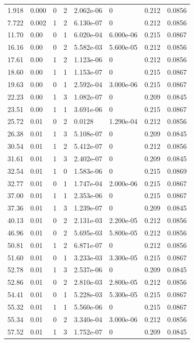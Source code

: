 \documentclass[preview]{standalone}
\begin{document}
{{\begin{tabular}{L{1.2cm}C{1.2cm} C{0.3cm}C{0.5cm} C{1.4cm}C{1.4cm} C{1.4cm}C{1.4cm}}
  1.918  &  0.000  & 0     &  2 &  2.062e-06  & 0  & 0.212 &  0.0856   \\ 
  7.722  &  0.002  & 1     &  2 &  6.130e-07  & 0  & 0.212 &  0.0856   \\ 
  11.70  &  0.00  & 0     &  1 &  6.020e-04  & 6.000e-06  & 0.215 &  0.0867   \\ 
  16.16  &  0.00  & 0     &  2 &  5.582e-03  & 5.600e-05  & 0.212 &  0.0856   \\ 
  17.61  &  0.00  & 1     &  2 &  1.123e-06  & 0  & 0.212 &  0.0856   \\ 
  18.60  &  0.00  & 1     &  1 &  1.153e-07  & 0  & 0.215 &  0.0867   \\ 
  19.63  &  0.00  & 0     &  1 &  2.592e-04  & 3.000e-06  & 0.215 &  0.0867   \\ 
  22.23  &  0.00  & 1     &  3 &  1.082e-07  & 0  & 0.209 &  0.0845   \\ 
  23.51  &  0.00  & 1     &  1 &  3.691e-06  & 0  & 0.215 &  0.0867   \\ 
  25.72  &  0.01  & 0     &  2 &  0.0128  & 1.290e-04  & 0.212 &  0.0856   \\ 
  26.38  &  0.01  & 1     &  3 &  5.108e-07  & 0  & 0.209 &  0.0845   \\ 
  30.54  &  0.01  & 1     &  2 &  5.412e-07  & 0  & 0.212 &  0.0856   \\ 
  31.61  &  0.01  & 1     &  3 &  2.402e-07  & 0  & 0.209 &  0.0845   \\ 
  32.54  &  0.01  & 1     &  0 &  1.583e-06  & 0  & 0.215 &  0.0869   \\ 
  32.77  &  0.01  & 0     &  1 &  1.747e-04  & 2.000e-06  & 0.215 &  0.0867   \\ 
  37.00  &  0.01  & 1     &  1 &  2.353e-06  & 0  & 0.215 &  0.0867   \\ 
  37.36  &  0.01  & 1     &  3 &  1.239e-07  & 0  & 0.209 &  0.0845   \\ 
  40.13  &  0.01  & 0     &  2 &  2.131e-03  & 2.200e-05  & 0.212 &  0.0856   \\ 
  46.96  &  0.01  & 0     &  2 &  5.695e-03  & 5.800e-05  & 0.212 &  0.0856   \\ 
  50.81  &  0.01  & 1     &  2 &  6.871e-07  & 0  & 0.212 &  0.0856   \\ 
  51.60  &  0.01  & 0     &  1 &  3.233e-03  & 3.300e-05  & 0.215 &  0.0867   \\ 
  52.78  &  0.01  & 1     &  3 &  2.537e-06  & 0  & 0.209 &  0.0845   \\ 
  52.86  &  0.01  & 0     &  2 &  2.810e-03  & 2.800e-05  & 0.212 &  0.0856   \\ 
  54.41  &  0.01  & 0     &  1 &  5.228e-03  & 5.300e-05  & 0.215 &  0.0867   \\ 
  55.32  &  0.01  & 1     &  1 &  5.560e-06  & 0  & 0.215 &  0.0867   \\ 
  55.34  &  0.01  & 0     &  2 &  3.340e-04  & 3.000e-06  & 0.212 &  0.0856   \\ 
  57.52  &  0.01  & 1     &  3 &  1.752e-07  & 0  & 0.209 &  0.0845   \\ 
\hline 
\end{tabular} 

}}
\end{document}
